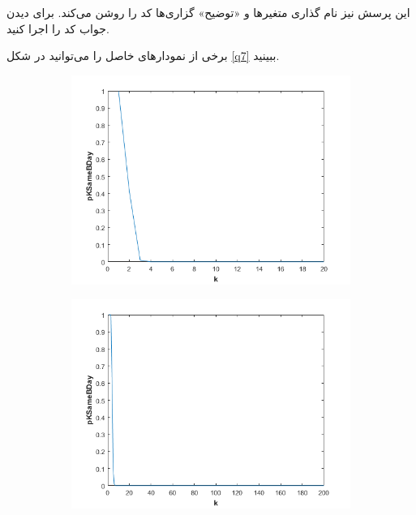 \documentclass[11pt]{article}
\theoremstyle{definition}
\theoremstyle{lemma}
\theoremstyle{remark}
\begin{document}
	این پرسش نیز نام گذاری متغیر‌ها و «توضیح» گزاری‌ها کد را روشن می‌کند. برای دیدن جواب
	کد را اجرا کنید. 
	
	برخی از نمودار‌های خاصل را می‌توانید در 
	\textcolor{darkishBlue}{شکل}
	\ref{q7}
	ببینید.
	\begin{figure}[h!]
		\centering
		\begin{subfigure}[h!]{0.48\textwidth}
			\includegraphics[width=\textwidth]{./Images/1/1.png}
			\caption{  }
		\end{subfigure}
		\quad
		\begin{subfigure}[h!]{0.48\textwidth}
			\includegraphics[width=\textwidth]{./Images/1/2.png}
			\caption{  }
		\end{subfigure}
		

\end{figure}
\end{document}
